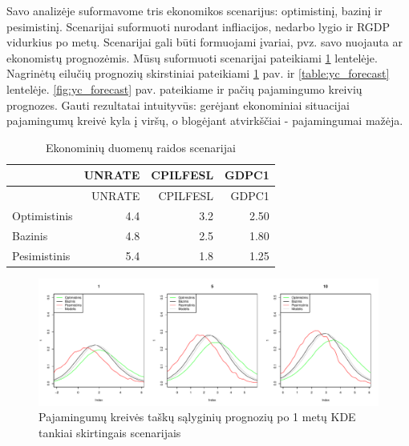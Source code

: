 \documentclass[12pt,lithuanian,]{article}
\begin{document}
Savo analizėje suformavome tris ekonomikos scenarijus: optimistinį,
bazinį ir pesimistinį. Scenarijai suformuoti nurodant infliacijos,
nedarbo lygio ir RGDP vidurkius po metų. Scenarijai gali būti formuojami
įvariai, pvz. savo nuojauta ar ekonomistų prognozėmis. Mūsų suformuoti
scenarijai pateikiami \ref{table:economy_scenarios} lentelėje. Nagrinėtų
eilučių prognozių skirstiniai pateikiami \ref{fig:PredDensity} pav. ir
\ref{table:yc_forecast} lentelėje. \ref{fig:yc_forecast} pav. pateikiame
ir pačių pajamingumo kreivių prognozes. Gauti rezultatai intuityvūs:
gerėjant ekonominiai situacijai pajamingumų kreivė kyla į viršų, o
blogėjant atvirkščiai - pajamingumai mažėja.

\begin{longtable}[]{@{}lrrr@{}}
\caption{\label{table:economy_scenarios}Ekonominių duomenų raidos
scenarijai}\tabularnewline
\toprule
& UNRATE & CPILFESL & GDPC1\tabularnewline
\midrule
\endfirsthead
\toprule
& UNRATE & CPILFESL & GDPC1\tabularnewline
\midrule
\endhead
Optimistinis & 4.4 & 3.2 & 2.50\tabularnewline
Bazinis & 4.8 & 2.5 & 1.80\tabularnewline
Pesimistinis & 5.4 & 1.8 & 1.25\tabularnewline
\bottomrule
\end{longtable}

\begin{figure}[htbp]
\centering
\includegraphics{bayesFAVAR_TVP_files/figure-latex/preddensity4-1.pdf}
\caption{\label{fig:PredDensity}Pajamingumų kreivės taškų sąlyginių
prognozių po 1 metų KDE tankiai skirtingais scenarijais}
\end{figure}
\end{document}
